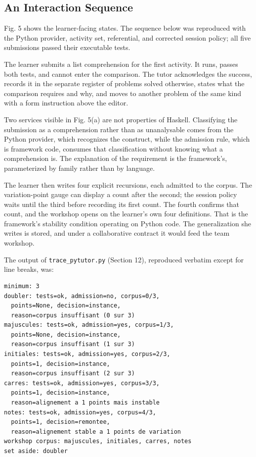 \documentclass[10pt,twocolumn,letterpaper]{article}
\begin{document}
\subsection{An Interaction Sequence}
Fig. 5 shows the learner-facing states. The sequence below was reproduced
with the Python provider, activity set, referential, and corrected session
policy; all five submissions passed their executable tests.

The learner submits a list comprehension for the first activity. It
runs, passes both tests, and cannot enter the comparison. The tutor
acknowledges the success, records it in the separate register of
problems solved otherwise, states what the comparison requires and why,
and moves to another problem of the same kind with a form instruction
above the editor.

Two services visible in Fig. 5(a) are not properties of Haskell.
Classifying the submission as a comprehension rather than as
unanalysable comes from the Python provider, which recognizes the
construct, while the admission rule, which is framework code, consumes
that classification without knowing what a comprehension is. The
explanation of the requirement is the framework's, parameterized by
family rather than by language.

The learner then writes four explicit recursions, each admitted to the
corpus. The variation-point gauge can display a count after the second;
the session policy waits until the third before recording its first
count. The fourth confirms that count, and the workshop opens on the
learner's own four definitions. That is the framework's stability
condition operating on Python code. The
generalization she writes is stored, and under a collaborative contract
it would feed the team workshop.

The output of \texttt{trace\_pytutor.py} (Section 12), reproduced verbatim
except for line breaks, was:
\begin{samepage}\noindent\begin{minipage}{\linewidth}
\begin{verbatim}
minimum: 3
doubler: tests=ok, admission=no, corpus=0/3,
  points=None, decision=instance,
  reason=corpus insuffisant (0 sur 3)
majuscules: tests=ok, admission=yes, corpus=1/3,
  points=None, decision=instance,
  reason=corpus insuffisant (1 sur 3)
initiales: tests=ok, admission=yes, corpus=2/3,
  points=1, decision=instance,
  reason=corpus insuffisant (2 sur 3)
carres: tests=ok, admission=yes, corpus=3/3,
  points=1, decision=instance,
  reason=alignement a 1 points mais instable
notes: tests=ok, admission=yes, corpus=4/3,
  points=1, decision=remontee,
  reason=alignement stable a 1 points de variation
workshop corpus: majuscules, initiales, carres, notes
set aside: doubler
\end{verbatim}
\end{minipage}\end{samepage}
\end{document}
